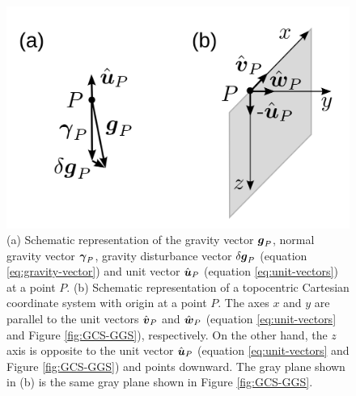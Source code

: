 \documentclass[extra]{gji}
\begin{document}
\begin{figure}
    \includegraphics{figures/local-system.png}
    \caption{(a) Schematic representation of the gravity vector
    $\mitbf{g}_{P}$, normal gravity vector $\mitbf{\gamma}_{P}$,
    gravity disturbance vector $\delta \mitbf{g}_{P}$
    (equation \ref{eq:gravity-vector}) and unit vector 
    $\hat{\mitbf{u}}_{P}$ (equation \ref{eq:unit-vectors}) at a point 
    $P$.
    (b) Schematic representation of a topocentric Cartesian 
    coordinate system with origin at a point $P$. The axes $x$
    and $y$ are parallel to the unit vectors $\hat{\mitbf{v}}_{P}$
    and $\hat{\mitbf{w}}_{P}$ (equation \ref{eq:unit-vectors} and
    Figure \ref{fig:GCS-GGS}), respectively. On the other hand, the $z$ axis is opposite to the unit vector $\hat{\mitbf{u}}_{P}$ (equation 
    \ref{eq:unit-vectors} and Figure \ref{fig:GCS-GGS}) and points downward. The gray plane shown in (b) is the same gray plane
    shown in Figure \ref{fig:GCS-GGS}.}
  \label{fig:TCS}
\end{figure}
\end{document}
